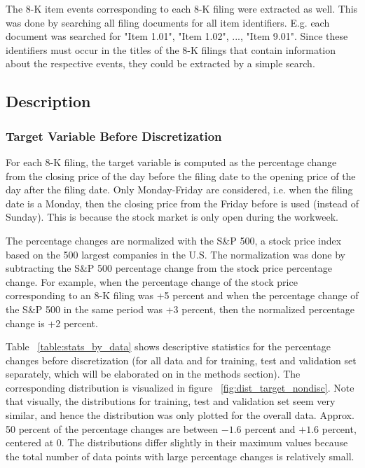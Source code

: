 \documentclass{article}
\begin{document}
	The 8-K item events corresponding to each 8-K filing were extracted as well. This was done by searching all filing documents for all item identifiers. E.g. each document was searched for "Item 1.01", "Item 1.02", ..., "Item 9.01". Since these identifiers must occur in the titles of the 8-K filings that contain information about the respective events, they could be extracted by a simple search. 
	
	\subsection{Description}
	
	
	\subsubsection{Target Variable Before Discretization}
	
	For each 8-K filing, the target variable is computed as the percentage change from the closing price of the day before the filing date to the opening price of the day after the filing date. Only Monday-Friday are considered, i.e. when the filing date is a Monday, then the closing price from the Friday before is used (instead of Sunday). This is because the stock market is only open during the workweek.
	
	The percentage changes are normalized with the S\&P 500, a stock price index based on the 500 largest companies in the U.S. The normalization was done by subtracting the S\&P 500 percentage change from the stock price percentage change. For example, when the percentage change of the stock price corresponding to an 8-K filing was +5 percent and when the percentage change of the S\&P 500 in the same period was +3 percent, then the normalized percentage change is +2 percent.
	
	Table ~\ref{table:stats_by_data} shows descriptive statistics for the percentage changes before discretization (for all data and for training, test and validation set separately, which will be elaborated on in the methods section). The corresponding distribution is visualized in figure ~\ref{fig:dist_target_nondisc}. Note that visually, the distributions for training, test and validation set seem very similar, and hence the distribution was only plotted for the overall data. Approx. 50 percent of the percentage changes are between $-1.6$ percent and $+1.6$ percent, centered at $0$. The distributions differ slightly in their maximum values because the total number of data points with large percentage changes is relatively small.
\end{document}
